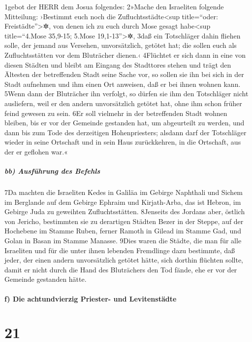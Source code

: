 1gebot der HERR dem Josua folgendes: 2»Mache den Israeliten folgende
Mitteilung: ›Bestimmt euch noch die Zufluchtsstädte\textless sup
title=``oder: Freistädte''\textgreater✲, von denen ich zu euch durch
Mose gesagt habe\textless sup title=``4.Mose 35,9-15; 5.Mose
19,1-13''\textgreater✲, 3daß ein Totschläger dahin fliehen solle, der
jemand aus Versehen, unvorsätzlich, getötet hat; die sollen euch als
Zufluchtsstätten vor dem Bluträcher dienen.‹ 4Flüchtet er sich dann in
eine von diesen Städten und bleibt am Eingang des Stadttores stehen und
trägt den Ältesten der betreffenden Stadt seine Sache vor, so sollen sie
ihn bei sich in der Stadt aufnehmen und ihm einen Ort anweisen, daß er
bei ihnen wohnen kann. 5Wenn dann der Bluträcher ihn verfolgt, so dürfen
sie ihm den Totschläger nicht ausliefern, weil er den andern
unvorsätzlich getötet hat, ohne ihm schon früher feind gewesen zu sein.
6Er soll vielmehr in der betreffenden Stadt wohnen bleiben, bis er vor
der Gemeinde gestanden hat, um abgeurteilt zu werden, und dann bis zum
Tode des derzeitigen Hohenpriesters; alsdann darf der Totschläger wieder
in seine Ortschaft und in sein Haus zurückkehren, in die Ortschaft, aus
der er geflohen war.«

\hypertarget{bb-ausfuxfchrung-des-befehls}{%
\subparagraph{bb) Ausführung des
Befehls}\label{bb-ausfuxfchrung-des-befehls}}

7Da machten die Israeliten Kedes in Galiläa im Gebirge Naphthali und
Sichem im Berglande auf dem Gebirge Ephraim und Kirjath-Arba, das ist
Hebron, im Gebirge Juda zu geweihten Zufluchtsstätten. 8Jenseits des
Jordans aber, östlich von Jericho, bestimmten sie zu derartigen Städten
Bezer in der Steppe, auf der Hochebene im Stamme Ruben, ferner Ramoth in
Gilead im Stamme Gad, und Golan in Basan im Stamme Manasse. 9Dies waren
die Städte, die man für alle Israeliten und für die unter ihnen lebenden
Fremdlinge dazu bestimmte, daß jeder, der einen andern unvorsätzlich
getötet hätte, sich dorthin flüchten sollte, damit er nicht durch die
Hand des Bluträchers den Tod fände, ehe er vor der Gemeinde gestanden
hätte.

\hypertarget{f-die-achtundvierzig-priester--und-levitenstuxe4dte}{%
\paragraph{f) Die achtundvierzig Priester- und
Levitenstädte}\label{f-die-achtundvierzig-priester--und-levitenstuxe4dte}}

\hypertarget{section-20}{%
\section{21}\label{section-20}}

